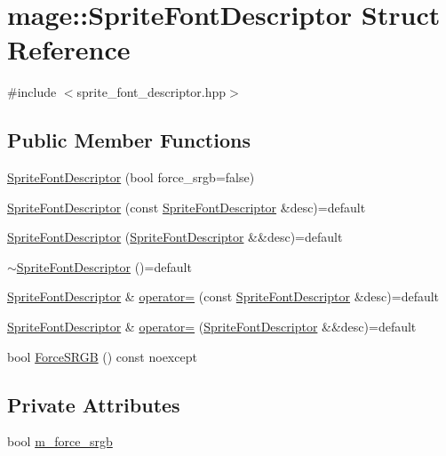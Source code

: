 \hypertarget{structmage_1_1_sprite_font_descriptor}{}\section{mage\+:\+:Sprite\+Font\+Descriptor Struct Reference}
\label{structmage_1_1_sprite_font_descriptor}


{\ttfamily \#include $<$sprite\+\_\+font\+\_\+descriptor.\+hpp$>$}

\subsection*{Public Member Functions}
\begin{DoxyCompactItemize}
\item 
\hyperlink{structmage_1_1_sprite_font_descriptor_a3622392aa130d14690c3cb1553b746bd}{Sprite\+Font\+Descriptor} (bool force\+\_\+srgb=false)
\item 
\hyperlink{structmage_1_1_sprite_font_descriptor_a8a8d4998026895fc55646a8d3538dcaa}{Sprite\+Font\+Descriptor} (const \hyperlink{structmage_1_1_sprite_font_descriptor}{Sprite\+Font\+Descriptor} \&desc)=default
\item 
\hyperlink{structmage_1_1_sprite_font_descriptor_a1b9b54d75205df352a65e6eb3665d675}{Sprite\+Font\+Descriptor} (\hyperlink{structmage_1_1_sprite_font_descriptor}{Sprite\+Font\+Descriptor} \&\&desc)=default
\item 
\hyperlink{structmage_1_1_sprite_font_descriptor_ab259871eed5ca9be3830d7da9cfc7092}{$\sim$\+Sprite\+Font\+Descriptor} ()=default
\item 
\hyperlink{structmage_1_1_sprite_font_descriptor}{Sprite\+Font\+Descriptor} \& \hyperlink{structmage_1_1_sprite_font_descriptor_a2279d65420bd8230a334c4ceb560fcf6}{operator=} (const \hyperlink{structmage_1_1_sprite_font_descriptor}{Sprite\+Font\+Descriptor} \&desc)=default
\item 
\hyperlink{structmage_1_1_sprite_font_descriptor}{Sprite\+Font\+Descriptor} \& \hyperlink{structmage_1_1_sprite_font_descriptor_a4d7c7df43f32819446f35ef71f49ebac}{operator=} (\hyperlink{structmage_1_1_sprite_font_descriptor}{Sprite\+Font\+Descriptor} \&\&desc)=default
\item 
bool \hyperlink{structmage_1_1_sprite_font_descriptor_a6124a9d8323768b970033eef43d0be6f}{Force\+S\+R\+GB} () const noexcept
\end{DoxyCompactItemize}
\subsection*{Private Attributes}
\begin{DoxyCompactItemize}
\item 
bool \hyperlink{structmage_1_1_sprite_font_descriptor_a7fa7230004e671127856e2ab1c27c94a}{m\+\_\+force\+\_\+srgb}
\end{DoxyCompactItemize}


